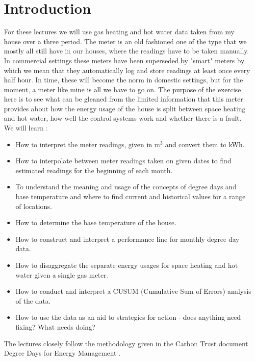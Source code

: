 \documentclass{article}
\begin{document}
\section{Introduction}

For these lectures we will use gas heating and hot water data taken from my house over a three period. The meter is an old fashioned one of the type that we mostly all still have in our houses, where the readings have to be taken manually. In commercial settings these meters have been superseded by "smart" meters by which we mean that they automatically log and store readings at least once every half hour. In time, these will become the norm in domestic settings, but for the moment, a meter like mine is all we have to go on.
The purpose of the exercise here is to see what can be gleaned from the limited information that this meter provides about how the energy usage of the house is split between space heating and hot water, how well the control systems work and whether there is a fault.\\


We will learn :

\begin{itemize}
  \item How to interpret the meter readings, given in m$^3$ and convert them to kWh.
  \item How to interpolate between meter readings taken on given dates to find estimated readings for the beginning of each month.
  \item To understand the meaning and usage of the concepts of degree days and base temperature and where to find current and historical values for a range of locations.
  \item How to determine the base temperature of the house.
  \item How to construct and interpret a performance line for monthly degree day data.
  \item How to disaggregate the separate energy usages for space heating and hot water given a single gas meter.
  \item How to conduct and interpret a CUSUM (Cumulative Sum of Errors) analysis of the data.
  \item How to use the data as an aid to strategies for action - does anything need fixing? What needs doing?
\end{itemize}

The lectures closely follow the methodology given in the Carbon Trust document Degree Days for Energy Management \cite{CarbonTrust2012}.\\
\end{document}
